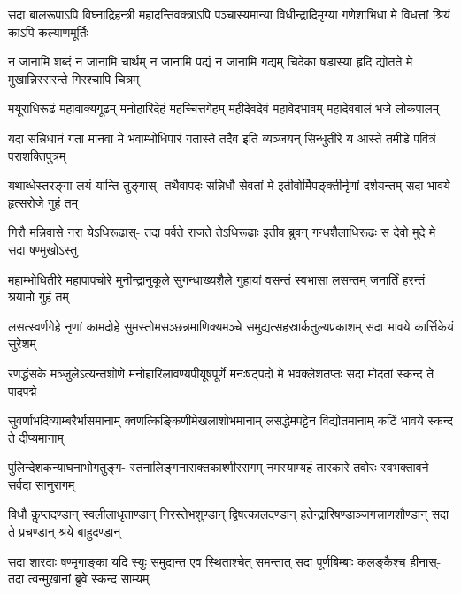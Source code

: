 
\fourlineindentedshloka
{सदा बालरूपाऽपि विघ्नाद्रिहन्त्री}
{महादन्तिवक्त्राऽपि पञ्चास्यमान्या}
{विधीन्द्रादिमृग्या गणेशाभिधा मे}
{विधत्तां श्रियं काऽपि कल्याणमूर्तिः}

\fourlineindentedshloka
{न जानामि शब्दं न जानामि चार्थम्}
{न जानामि पद्यं न जानामि गद्यम्}
{चिदेका षडास्या हृदि द्योतते मे}
{मुखान्निस्सरन्ते गिरश्चापि चित्रम्}

\fourlineindentedshloka
{मयूराधिरूढं महावाक्यगूढम्}
{मनोहारिदेहं महच्चित्तगेहम्}
{महीदेवदेवं महावेदभावम्}
{महादेवबालं भजे लोकपालम्}

\fourlineindentedshloka
{यदा सन्निधानं गता मानवा मे}
{भवाम्भोधिपारं गतास्ते तदैव}
{इति व्यञ्जयन् सिन्धुतीरे य आस्ते}
{तमीडे पवित्रं पराशक्तिपुत्रम्}

\fourlineindentedshloka
{यथाब्धेस्तरङ्गा लयं यान्ति तुङ्गास्-}
{तथैवापदः सन्निधौ सेवतां मे}
{इतीवोर्मिपङ्क्तीर्नृणां दर्शयन्तम्}
{सदा भावये हृत्सरोजे गुहं तम्}

\fourlineindentedshloka
{गिरौ मन्निवासे नरा येऽधिरूढास्-}
{तदा पर्वते राजते तेऽधिरूढाः}
{इतीव ब्रुवन् गन्धशैलाधिरूढः}
{स देवो मुदे मे सदा षण्मुखोऽस्तु}

\fourlineindentedshloka
{महाम्भोधितीरे महापापचोरे}
{मुनीन्द्रानुकूले सुगन्धाख्यशैले}
{गुहायां वसन्तं स्वभासा लसन्तम्}
{जनार्तिं हरन्तं श्रयामो गुहं तम्}

\fourlineindentedshloka
{लसत्स्वर्णगेहे नृणां कामदोहे}
{सुमस्तोमसञ्छन्नमाणिक्यमञ्चे}
{समुद्यत्सहस्रार्कतुल्यप्रकाशम्}
{सदा भावये कार्त्तिकेयं सुरेशम्}

\fourlineindentedshloka
{रणद्धंसके मञ्जुलेऽत्यन्तशोणे}
{मनोहारिलावण्यपीयूषपूर्णे}
{मनःषट्पदो मे भवक्लेशतप्तः}
{सदा मोदतां स्कन्द ते पादपद्मे}

\fourlineindentedshloka
{सुवर्णाभदिव्याम्बरैर्भासमानाम्}
{क्वणत्किङ्किणीमेखलाशोभमानाम्}
{लसद्धेमपट्टेन विद्योतमानाम्}
{कटिं भावये स्कन्द ते दीप्यमानाम्}

\fourlineindentedshloka
{पुलिन्देशकन्याघनाभोगतुङ्ग-}
{स्तनालिङ्गनासक्तकाश्मीररागम्}
{नमस्याम्यहं तारकारे तवोरः}
{स्वभक्तावने सर्वदा सानुरागम्}

\fourlineindentedshloka
{विधौ कॢप्तदण्डान् स्वलीलाधृताण्डान्}
{निरस्तेभशुण्डान् द्विषत्कालदण्डान्}
{हतेन्द्रारिषण्डाञ्जगत्त्राणशौण्डान्}
{सदा ते प्रचण्डान् श्रये बाहुदण्डान्}

\fourlineindentedshloka
{सदा शारदाः षण्मृगाङ्का यदि स्युः}
{समुद्यन्त एव स्थिताश्चेत् समन्तात्}
{सदा पूर्णबिम्बाः कलङ्कैश्च हीनास्-}
{तदा त्वन्मुखानां ब्रुवे स्कन्द साम्यम्}

